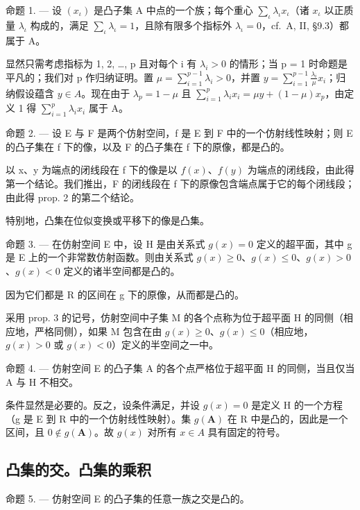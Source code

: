 命题 1. --- 设 \((x_{\iota})\) 是凸子集 A 中点的一个族；每个重心 \(\sum_{\iota} \lambda_{\iota} x_{\iota}\)（诸 \(x_{\iota}\) 以正质量 \(\lambda_{\iota}\) 构成的，满足 \(\sum_{\iota} \lambda_{\iota} = 1\)，且除有限多个指标外 \(\lambda_{\iota} = 0\)，cf.~A, II, §9.3）都属于 A。

显然只需考虑指标为 1, 2, \ldots, p 且对每个 i 有 \(\lambda_{i} > 0\) 的情形；当 p = 1 时命题是平凡的；我们对 p 作归纳证明。置 \(\mu = \sum_{i=1}^{p-1} \lambda_{i} > 0\)，并置 \(y = \sum_{i=1}^{p-1} \frac{\lambda_{i}}{\mu} x_{i}\)；归纳假设蕴含 \(y \in A\)。现在由于 \(\lambda_{p} = 1 - \mu\) 且 \(\sum_{i=1}^{p} \lambda_{i} x_{i} = \mu y + (1 - \mu) x_{p}\)，由定义 1 得 \(\sum_{i=1}^{p} \lambda_{i} x_{i}\) 属于 A。

命题 2. --- 设 E 与 F 是两个仿射空间，f 是 E 到 F 中的一个仿射线性映射；则 E 的凸子集在 f 下的像，以及 F 的凸子集在 f 下的原像，都是凸的。

以 x、y 为端点的闭线段在 f 下的像是以 \(f(x)\)、\(f(y)\) 为端点的闭线段，由此得第一个结论。我们推出，F 的闭线段在 f 下的原像包含端点属于它的每个闭线段；由此得 prop. 2 的第二个结论。

特别地，凸集在位似变换或平移下的像是凸集。

命题 3. --- 在仿射空间 E 中，设 H 是由关系式 \(g(x) = 0\) 定义的超平面，其中 g 是 E 上的一个非常数仿射函数。则由关系式 \(g(x) \geqslant 0\)、\(g(x) \leqslant 0\)、\(g(x) > 0\)、\(g(x) < 0\) 定义的诸半空间都是凸的。

因为它们都是 R 的区间在 g 下的原像，从而都是凸的。

采用 prop. 3 的记号，仿射空间中子集 M 的各个点称为位于超平面 H 的同侧（相应地，严格同侧），如果 M 包含在由 \(g(x) \geqslant 0\)、\(g(x) \leqslant 0\)（相应地，\(g(x) > 0\) 或 \(g(x) < 0\)）定义的半空间之一中。

命题 4. --- 仿射空间 E 的凸子集 A 的各个点严格位于超平面 H 的同侧，当且仅当 A 与 H 不相交。

条件显然是必要的。反之，设条件满足，并设 \(g(x) = 0\) 是定义 H 的一个方程（g 是 E 到 R 中的一个仿射线性映射）。集 \(g(\mathbf{A})\) 在 R 中是凸的，因此是一个区间，且 \(0 \notin g(\mathbf{A})\)。故 \(g(x)\) 对所有 \(x \in A\) 具有固定的符号。

\subsection{凸集的交。凸集的乘积}

命题 5. --- 仿射空间 E 的凸子集的任意一族之交是凸的。

